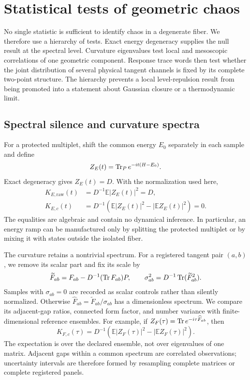 \section{Statistical tests of geometric chaos}
\label{sec:statistics}

No single statistic is sufficient to identify chaos in a degenerate fiber.
We therefore use a hierarchy of tests.  Exact energy degeneracy supplies the
null result at the spectral level.  Curvature eigenvalues test local and
mesoscopic correlations of one geometric component.  Response trace words
then test whether the joint distribution of several physical tangent channels
is fixed by its complete two-point structure.  The hierarchy prevents a local
level-repulsion result from being promoted into a statement about Gaussian
closure or a thermodynamic limit.

\subsection{Spectral silence and curvature spectra}

For a protected multiplet, shift the common energy $E_0$ separately in each
sample and define
\[
 Z_E(t)=\operatorname{Tr}_P e^{-it(H-E_0)}.
\]
Exact degeneracy gives $Z_E(t)=D$.  With the normalization used here,
\begin{align}
 K_{E,\mathrm{raw}}(t)&=D^{-1}\mathbb E|Z_E(t)|^2=D,\nonumber\\
 K_{E,c}(t)&=D^{-1}\left(\mathbb E|Z_E(t)|^2
 -|\mathbb EZ_E(t)|^2\right)=0.
\end{align}
The equalities are algebraic and contain no dynamical inference.  In
particular, an energy ramp can be manufactured only by splitting the protected
multiplet or by mixing it with states outside the isolated fiber.

The curvature retains a nontrivial spectrum.  For a registered tangent pair
$(a,b)$, we remove its scalar part and fix its scale by
\[
 \widetilde F_{ab}=F_{ab}-D^{-1}(\operatorname{Tr} F_{ab})P,
 \qquad
 \sigma_{ab}^2=D^{-1}\operatorname{Tr}(\widetilde F_{ab}^{2}).
\]
Samples with $\sigma_{ab}=0$ are recorded as scalar controls rather than
silently normalized.  Otherwise $\widehat F_{ab}=\widetilde F_{ab}/\sigma_{ab}$
has a dimensionless spectrum.  We compare its adjacent-gap ratios, connected
form factor, and number variance with finite-dimensional reference ensembles.
For example, if $Z_F(\tau)=\operatorname{Tr} e^{-i\tau\widehat F_{ab}}$, then
\[
 K_{F,c}(\tau)=D^{-1}\left(
 \mathbb E|Z_F(\tau)|^2-|\mathbb EZ_F(\tau)|^2\right).
\]
The expectation is over the declared ensemble, not over eigenvalues of one
matrix.  Adjacent gaps within a common spectrum are correlated observations;
uncertainty intervals are therefore formed by resampling complete matrices or
complete registered panels.

